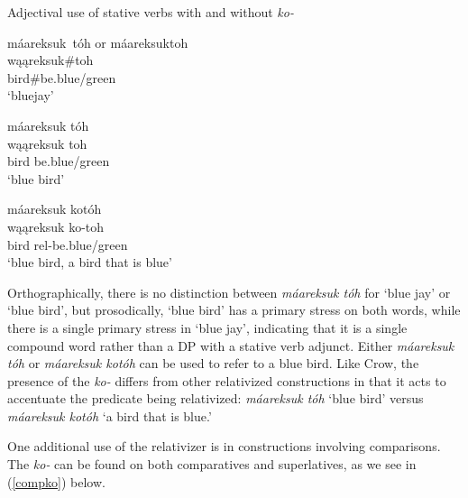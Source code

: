 \newpage
\begin{exe}

\item\label{adjko} Adjectival use of stative verbs with and without \textit{ko-}

	\begin{xlist}
	
	\item\label{adjko1} \glll máareksuk~tóh \textnormal{or} máareksuktoh\\
	wąąreksuk\#toh\\
	\textnormal{bird}\#\textnormal{be.blue/green}\\
	\glt `bluejay'
	
	\item\label{adjko2} \glll máareksuk tóh\\
	wąąreksuk toh\\
	\textnormal{bird} \textnormal{be.blue/green}\\
	\glt `blue bird'
	
	\item\label{adjko3} \glll máareksuk kotóh\\
	wąąreksuk ko-toh\\
	\textnormal{bird} rel-\textnormal{be.blue/green}\\
	\glt `blue bird, a bird that is blue'
	
	\end{xlist}

\end{exe}

Orthographically, there is no distinction between \textit{máareksuk tóh} for `blue jay' or `blue bird', but prosodically, `blue bird' has a primary stress on both words, while there is a single primary stress in `blue jay', indicating that it is a single compound word rather than a DP with a stative verb adjunct. Either \textit{máareksuk tóh} or \textit{máareksuk kotóh} can be used to refer to a blue bird. Like Crow, the presence of the \textit{ko-} differs from other relativized constructions in that it acts to accentuate the predicate being relativized: \textit{máareksuk tóh} `blue bird' versus \textit{máareksuk kotóh} `a bird that is blue.'

One additional use of the relativizer is in constructions involving comparisons. The \textit{ko-} can be found on both comparatives and superlatives, as we see in (\ref{compko}) below.


